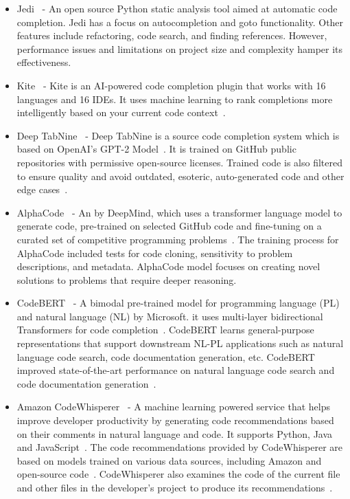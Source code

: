 \begin{itemize}
    \item Jedi~\cite{jedi} - An open source Python static analysis tool aimed at automatic code completion. Jedi has a focus on autocompletion and goto functionality. Other features include refactoring, code search, and finding references. However, performance issues and limitations on project size and complexity hamper its effectiveness.
    \item Kite~\cite{kite} - Kite is an AI-powered code completion plugin that works with 16 languages and 16 IDEs. It uses machine learning to rank completions more intelligently based on your current code context~\cite{kite}.
    \item Deep TabNine~\cite{tabnine} - Deep TabNine is a source code completion system which is based on OpenAI's GPT-2 Model~\cite{gpt2}. It is trained on GitHub public repositories with permissive open-source licenses. Trained code is also filtered to ensure quality and avoid outdated, esoteric, auto-generated code and other edge cases~\cite{tabnine}.
    \item AlphaCode~\cite{alphacode} - An \cct{} by DeepMind, which uses a transformer language model to generate code, pre-trained on selected GitHub code and fine-tuning on a curated set of competitive programming problems~\cite{alphacode}. The training process for AlphaCode included tests for code cloning, sensitivity to problem descriptions, and metadata. AlphaCode model focuses on creating novel solutions to problems that require deeper reasoning. 
    \item CodeBERT~\cite{codebert} - A bimodal pre-trained model for programming language (PL) and natural language (NL) by Microsoft. it uses multi-layer bidirectional Transformers for code completion~\cite{codebert}. CodeBERT learns general-purpose representations that support downstream NL-PL applications such as natural language code search, code documentation generation, etc. CodeBERT improved state-of-the-art performance on natural language code search and code documentation generation~\cite{codebert}.
    \item Amazon CodeWhisperer~\cite{amazon} - A machine learning powered service that helps improve developer productivity by generating code recommendations based on their comments in natural language and code. It supports Python, Java and JavaScript~\cite{amazon}. The code recommendations provided by CodeWhisperer are based on models trained on various data sources, including Amazon and open-source code~\cite{amazon}. CodeWhisperer also examines the code of the current file and other files in the developer's project to produce its recommendations~\cite{amazon}.
\end{itemize}
